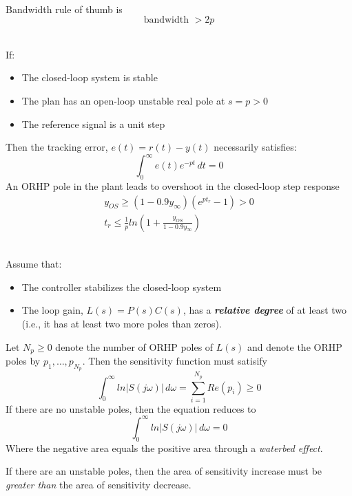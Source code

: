 \documentclass[12pt]{article}
\begin{document}
\begin{multicols*}{2}
    \underline{} \\
    Bandwidth rule of thumb is
    \[ \text{bandwidth } > 2p \]

    \underline{} \\
    If:
    \begin{itemize}
        \item The closed-loop system is stable
        \item The plan has an open-loop unstable real pole at \( s = p > 0 \)
        \item The reference signal is a unit step
    \end{itemize}
    Then the tracking error, \( e(t) = r(t) - y(t) \) necessarily satisfies:
    \[
        \int_{0}^{\infty} e(t)e^{-pt} \,dt = 0
    \]
    An ORHP pole in the plant leads to overshoot in the closed-loop step response \\
    \begin{gather*}
        y_{OS} \geq (1 - 0.9y_\infty)(e^{pt_r} - 1) > 0 \\
        t_r \leq \frac{1}{p} ln \left( 1 + \frac{y_{OS}}{1 - 0.9y_\infty} \right)
    \end{gather*}

    \underline{} \\
    Assume that:
    \begin{itemize}
        \item The controller stabilizes the closed-loop system
        \item The loop gain, \( L(s) = P(s) C(s) \), has a \textbf{\textit{relative degree}} of at least two (i.e., it has at least two more poles than zeros).
    \end{itemize}
    Let \( N_p \geq 0 \) denote the number of ORHP poles of \( L(s) \) and denote the ORHP poles by \( p_1, \ldots , p_{N_p} \). Then the sensitivity function must satisify
    \[
        \int_{0}^{\infty} ln|S(j\omega)| \,d\omega = \sum_{i = 1}^{N_p} Re(p_i) \geq 0
    \]
    If there are no unstable poles, then the equation reduces to
    \[
        \int_{0}^{\infty} ln|S(j\omega)| \,d\omega = 0
    \]
    Where the negative area equals the positive area through a \textit{waterbed effect}.

    If there are an unstable poles, then the area of sensitivity increase must be \textit{greater than} the area of sensitivity decrease.


\end{multicols*}
\end{document}

